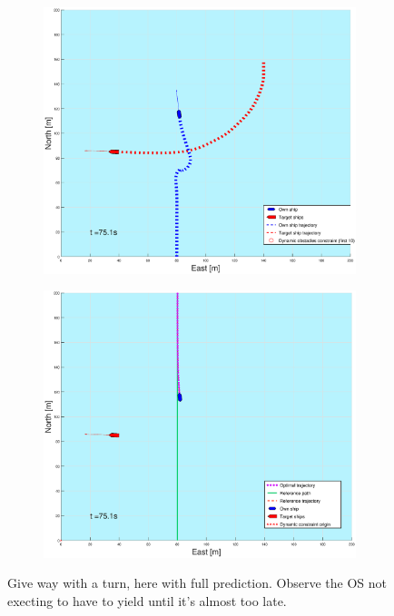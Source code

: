 \begin{figure}[ht!]
\begin{subfigure}[b]{0.499\textwidth}
    \end{subfigure}
    \hfill
    \\
    \begin{subfigure}[b]{0.49\textwidth}
        \centering
        \includegraphics[width=\textwidth]{Images/Figures/sving_GW/_Simple_0fig1_time=75}
    \end{subfigure}
    \hfill
    \begin{subfigure}[b]{0.499\textwidth}
        \centering
        \includegraphics[width=\textwidth]{Images/Figures/sving_GW/_Simple_0fig999_time=75}
    \end{subfigure}
    \hfill
    \caption{Give way with a turn, here with full prediction. Observe the \gls{OS} not execting to have to yield until it's almost too late.}
\end{figure}%
